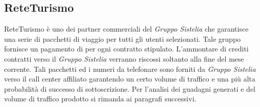 \subsection[ReteTurismo]{ReteTurismo}
ReteTurismo è uno dei partner commerciali del \textit{Gruppo Sistelia} che garantisce una serie di pacchetti di viaggio per tutti gli utenti selezionati. Tale gruppo fornisce un pagamento di  per ogni contratto stipulato.
L'ammontare di crediti contratti verso il \textit{Gruppo Sistelia} verranno riscossi soltanto alla fine del mese corrente.
Tali pacchetti ed i numeri da telefonare sono forniti da \textit{Gruppo Sistelia} verso il call center affiliato garantendo un certo volume di traffico e una più alta probabilità di successo di sottoscrizione.
Per l'analisi dei guadagni generati e del volume di traffico prodotto si rimanda ai paragrafi successivi.